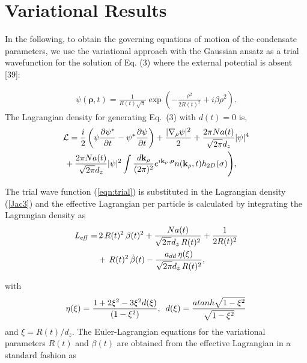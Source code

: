 \documentclass[amsmath,amssymb,article,twocolumn,superscriptaddress,showpacs,10pt]{revtex4-1}
\begin{document}

\section{Variational Results}
\label{sec3}
In the following, to obtain the governing equations of motion of the condensate parameters, we use the variational approach with the Gaussian ansatz as a trial wavefunction for the solution of Eq. (3) where the external potential is absent [39]:

\begin{eqnarray}
\psi(\boldsymbol{\rho},t) = \frac{1}{R(t)\sqrt{\pi}}\exp{\left(-\frac{\rho^2}{2R(t)^2}+i\beta \rho^2 \right)}. \label{eqn:trial}
\end{eqnarray}
The Lagrangian density for generating Eq.~(3) with $d(t) = 0$ is,
\begin{eqnarray}
& \mathcal{L}=  \displaystyle \frac{i}{2} \left(\psi \frac{\partial\psi^*}{\partial t} -\psi^* \frac{\partial\psi}{\partial t} \right)+ \frac{\vert\nabla_{\rho} \psi \vert^2}{2}  + \frac{2\pi Na(t)}{\sqrt{2\pi}d_z} \vert  \psi\vert^4  \nonumber \\
&\,\displaystyle+\frac{2\pi Na(t)}{\sqrt{2\pi}d_z}\vert  \psi\vert^2  \int\frac{d{\bf k}_{\rho}}{(2\pi)^2}e^{i{\bf k}_{\rho}.\boldsymbol{\rho}} n({\bf k}_\rho,t)h_{2D}(\sigma)\Bigg), \label{Jac3}
\end{eqnarray}

The trial wave function (\ref{eqn:trial}) is substituted in the Lagrangian density (\ref{Jac3}) and the effective Lagrangian per particle is calculated by integrating the Lagrangian density as 
\begin{align}
\begin{split}
 \it{L_{eff}} = &\, 2\,R(t)^2\,\beta(t)^2+\frac{N a(t)}{\sqrt{2\pi} d_z \, R(t)^2}+\frac {1}{2R(t)^2} \nonumber \\
&+\, R(t)^2\,\dot{\beta}(t)-\frac{a_{dd}\,\eta(\xi)}{\sqrt{2\pi} d_z \, R(t)^2}, \label{Jac3a}
\end{split} 
\end{align}

 \noindent with
 \begin{equation} \eta(\xi)=\frac{1+2\xi^2-3\xi^2 d(\xi)}{(1-\xi^2)}, \,\,\,d(\xi)=\frac{atanh\sqrt{1-\xi^2}}{\sqrt{1-\xi^2}} \nonumber \\\end{equation} 
 and $\xi=R(t)/d_z$. The Euler-Lagrangian equations for the variational parameters $R(t)$ and $\beta(t)$ are obtained from the effective Lagrangian in a standard fashion as
\end{document}
